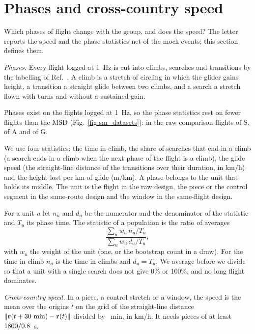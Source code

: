 \documentclass[aps,prl,twocolumn,superscriptaddress,nofootinbib]{revtex4-2}
\begin{document}
\section{Phases and cross-country speed}\label{sm:phases}

Which phases of flight change with the group, and does the speed? The letter reports the speed and the
phase statistics net of the mock events; this section defines them.

\emph{Phases.} Every flight logged at 1~Hz is cut into climbs, searches and transitions by the
labelling of Ref.~\cite{Vilpellet2026}. A climb is a stretch of circling in which the glider gains
height, a transition a straight glide between two climbs, and a search a stretch flown with turns and
without a sustained gain.

Phases exist on the flights logged at 1~Hz, so the phase statistics rest on fewer flights than the MSD
(Fig.~\ref{fig:sm_datasets}): in the raw comparison \RawPhaseFlightsS{} flights of S,
\RawPhaseFlightsA{} of A and \RawPhaseFlightsG{} of G.

We use four statistics: the time in climb, the share of searches that end in a climb (a search ends in
a climb when the next phase of the flight is a climb), the glide speed (the straight-line distance of
the transitions over their duration, in km/h) and the height lost per km of glide (m/km). A phase
belongs to the unit that holds its middle. The unit is the flight in the raw design, the piece or the
control segment in the same-route design and the window in the same-flight design.

For a unit $u$ let $n_u$ and $d_u$ be the numerator and the denominator of the statistic and $T_u$ its
phase time. The statistic of a population is the ratio of averages
\begin{equation}
\frac{\sum_u w_u\, n_u/T_u}{\sum_u w_u\, d_u/T_u},
\end{equation}
with $w_u$ the weight of the unit (one, or the bootstrap count in a draw). For the time in climb $n_u$
is the time in climbs and $d_u = T_u$. We average before we divide so that a unit with a single search
does not give 0\% or 100\%, and no long flight dominates.

\emph{Cross-country speed.} In a piece, a control stretch or a window, the speed is the mean over the
origins $t$ on the grid of the straight-line distance $\|\mathbf{r}(t+30~\mathrm{min}) -
\mathbf{r}(t)\|$ divided by \LtXcMin~min, in km/h. It needs pieces of at least $1800/0.8$~s.
\end{document}
